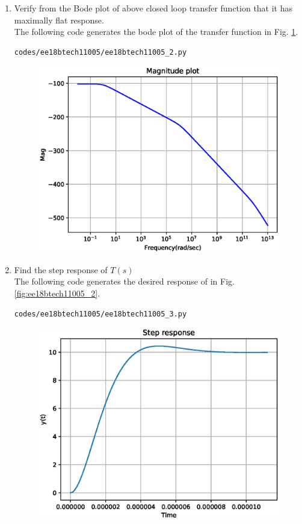 \begin{enumerate}[label=\arabic*.,ref=\theenumi]
\item Verify from the Bode plot of above closed loop transfer function that it has maximally flat response.
\\
\solution The following code generates the bode plot of the transfer function in Fig. \ref{fig:ee18btech11005_1}.
\begin{lstlisting}
codes/ee18btech11005/ee18btech11005_2.py
\end{lstlisting}
\begin{figure}[!ht]
\centering
\includegraphics[width=\columnwidth]{./figs/ee18btech11005/ee18btech11005_1.eps}
\caption{}
\label{fig:ee18btech11005_1}
\end{figure}
\item Find the step response of $T(s)$
\\
\solution The following code generates the desired response of in Fig. \ref{fig:ee18btech11005_2}.
\begin{lstlisting}
codes/ee18btech11005/ee18btech11005_3.py
\end{lstlisting}
%
\begin{figure}[!ht]
\centering
\includegraphics[width=\columnwidth]{./figs/ee18btech11005/ee18btech11005_2.eps}

\end{figure}
\end{enumerate}
